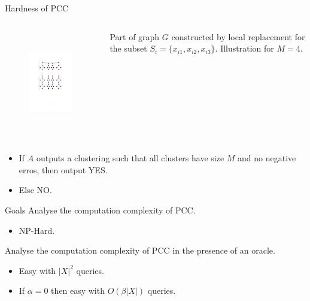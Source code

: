 \documentclass{beamer}
\begin{document}
\begin{frame}{Hardness of PCC}
	\begin{columns}
		\begin{column}{0.48\textwidth}
			\vspace{-40pt}\begin{figure}
				\centering
				\includegraphics[trim = 100 290 100 100, clip, width=6cm, height=4.5cm]{figures/deDuplication/pccHard.pdf}
			\end{figure}
		\end{column}

		\begin{column}{0.48\textwidth}
		    Part of graph $G$ constructed by local replacement for the subset $S_i =  \{x_{i1}, x_{i2}, x_{i3}\}$. Illustration for $M = 4$.
		\end{column}
	\end{columns}

	
	\vspace{20pt}\begin{itemize}
		\item If $A$ outputs a clustering such that all clusters have size $M$ and no negative erros, then output YES.
		\vspace{10pt}\item Else NO.
	\end{itemize}
\end{frame}

\begin{frame}{Goals}
	Analyse the computation complexity of PCC.
	\begin{itemize}
		\vspace{10pt}\item NP-Hard.
	\end{itemize}	 
	\vspace{30pt}Analyse the computation complexity of PCC in the presence of an oracle.
	\begin{itemize}
		\vspace{10pt}\item Easy with $|X|^2$ queries.
		\vspace{10pt}\item If $\alpha = 0$ then easy with $O(\beta|X|)$ queries.
	\end{itemize}
\end{frame}
\end{document}
